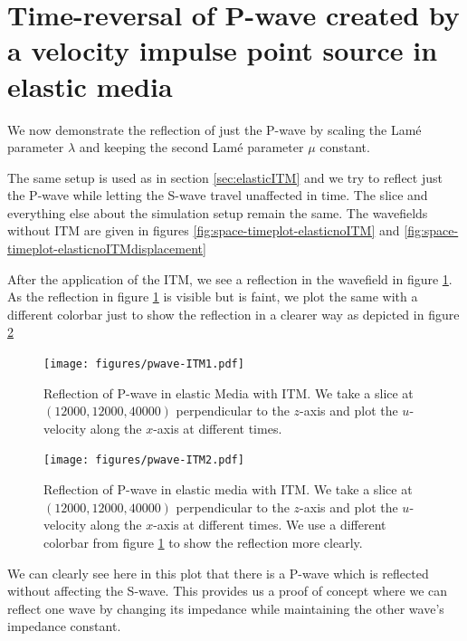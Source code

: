 \section{Time-reversal of P-wave created by a velocity impulse point source in elastic media} \label{sec:elasticITMpwave}
We now demonstrate the reflection of just the P-wave by scaling the Lam\'{e} parameter $\lambda$ and keeping the second Lam\'{e} parameter $\mu$ constant.
\par The same setup is used as in section \ref{sec:elasticITM} and we try to reflect just the P-wave while letting the S-wave travel unaffected in time. The slice
and everything else about the simulation setup remain the same. The wavefields without \ac{ITM} are given in figures \ref{fig:space-timeplot-elasticnoITM} and
\ref{fig:space-timeplot-elasticnoITMdisplacement}
\par After the application of the \ac{ITM}, we see a reflection in the wavefield in figure \ref{fig:space-timeplot-pwave}.
As the reflection in figure \ref{fig:space-timeplot-pwave} is visible but is faint, we plot the same with a different colorbar just to show the reflection in a clearer
way as depicted in figure \ref{fig:space-timeplot-pwave2}
\begin{figure}[htpb]
    \centering
    \texttt{[image: figures/pwave-ITM1.pdf]}
    \caption{Reflection of P-wave in elastic Media with \ac{ITM}. We take a slice at $\left(12000,12000,40000\right)$ perpendicular to the $z$-axis
    and plot the $u$-velocity along the $x$-axis at different times.}
    \label{fig:space-timeplot-pwave}
\end{figure}

\begin{figure}[htpb] %
    \centering
    \texttt{[image: figures/pwave-ITM2.pdf]}
    \caption{Reflection of P-wave in elastic media with \ac{ITM}. We take a slice at $\left(12000,12000,40000\right)$ perpendicular to the $z$-axis
    and plot the $u$-velocity along the $x$-axis at different times. We use a different colorbar from figure \ref{fig:space-timeplot-pwave} to show the reflection more clearly.}
    \label{fig:space-timeplot-pwave2}
\end{figure}
\par We can clearly see here in this plot that there is a P-wave which is reflected without affecting the S-wave. This provides us a proof of concept where we 
can reflect one wave by changing its impedance while maintaining the other wave's impedance constant.

